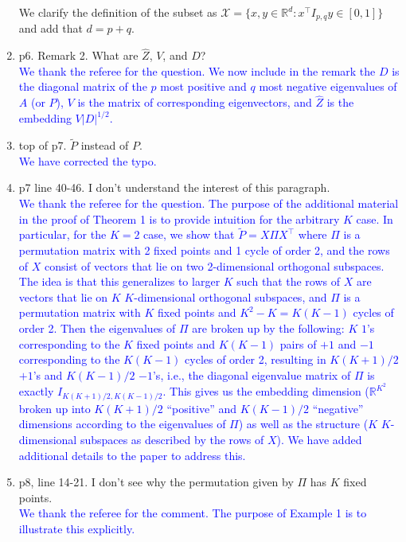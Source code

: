 \documentclass[
]{article}
\begin{document}
\begin{enumerate}
{  We clarify the definition of the subset as $\mathcal{X} = \{x, y \in \mathbb{R}^d : x^\top I_{p, q} y \in [0, 1]\}$ and add that $d = p + q$. 
  }
\item
  p6. Remark 2. What are \(\hat{Z}\), \(V\), and \(D\)?\\
  \textcolor{blue}{
  We thank the referee for the question. 
  We now include in the remark the $D$ is the diagonal matrix of the $p$ most positive and $q$ most negative eigenvalues of $A$ (or $P$), $V$ is the matrix of corresponding eigenvectors, and $\hat{Z}$ is the embedding $V |D|^{1/2}$.
  }
\item
  top of p7. \(\tilde{P}\) instead of \({P}\).\\
  \textcolor{blue}{
  We have corrected the typo. 
  }
\item
  p7 line 40-46. I don't understand the interest of this paragraph.\\
  \textcolor{blue}{
  We thank the referee for the question. 
  The purpose of the additional material in the proof of Theorem 1 is to provide intuition for the arbitrary $K$ case. 
  In particular, for the $K = 2$ case, we show that $\tilde{P} = X \Pi X^\top$ where $\Pi$ is a permutation matrix with 2 fixed points and 1 cycle of order 2, and the rows of $X$ consist of vectors that lie on two 2-dimensional orthogonal subspaces. 
  The idea is that this generalizes to larger $K$ such that the rows of $X$ are vectors that lie on $K$ $K$-dimensional orthogonal subspaces, and $\Pi$ is a permutation matrix with $K$ fixed points and $K^2 - K = K (K - 1)$ cycles of order 2. 
  Then the eigenvalues of $\Pi$ are broken up by the following: $K$ $1$'s corresponding to the $K$ fixed points and $K (K - 1)$ pairs of $+1$ and $-1$ corresponding to the $K (K - 1)$ cycles of order 2, 
  resulting in $K (K + 1) / 2$ $+1$'s and $K (K - 1) / 2$ $-1$'s, i.e., the diagonal eigenvalue matrix of $\Pi$ is exactly $I_{K (K + 1) / 2, K (K - 1) / 2}$. 
  This gives us the embedding dimension ($\mathbb{R}^{K^2}$ broken up into $K (K + 1) / 2$ ``positive'' and $K (K - 1) / 2$ ``negative'' dimensions according to the eigenvalues of $\Pi$) as well as the structure ($K$ $K$-dimensional subspaces as described by the rows of $X$). 
  We have added additional details to the paper to address this. 
  }
\item
  p8, line 14-21. I don't see why the permutation given by \(\Pi\) has
  \(K\) fixed points.\\
  \textcolor{blue}{
  We thank the referee for the comment. 
  The purpose of Example 1 is to illustrate this explicitly. 
}
\end{enumerate}
\end{document}
